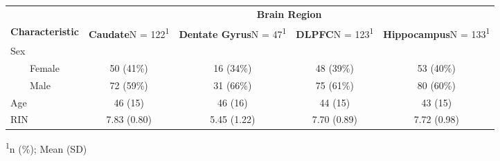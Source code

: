 \setlength{\LTpost}{0mm}
\begin{longtable}{lcccc}
\toprule
 & \multicolumn{4}{c}{\textbf{Brain Region}} \\ 
\cmidrule(lr){2-5}
\textbf{Characteristic} & \textbf{Caudate}N = 122\textsuperscript{1} & \textbf{Dentate Gyrus}N = 47\textsuperscript{1} & \textbf{DLPFC}N = 123\textsuperscript{1} & \textbf{Hippocampus}N = 133\textsuperscript{1} \\ 
\midrule
Sex &  &  &  &  \\ 
    Female & 50 (41\%) & 16 (34\%) & 48 (39\%) & 53 (40\%) \\ 
    Male & 72 (59\%) & 31 (66\%) & 75 (61\%) & 80 (60\%) \\ 
Age & 46 (15) & 46 (16) & 44 (15) & 43 (15) \\ 
RIN & 7.83 (0.80) & 5.45 (1.22) & 7.70 (0.89) & 7.72 (0.98) \\ 
\bottomrule
\end{longtable}
\begin{minipage}{\linewidth}
\textsuperscript{1}n (\%); Mean (SD)\\
\end{minipage}


